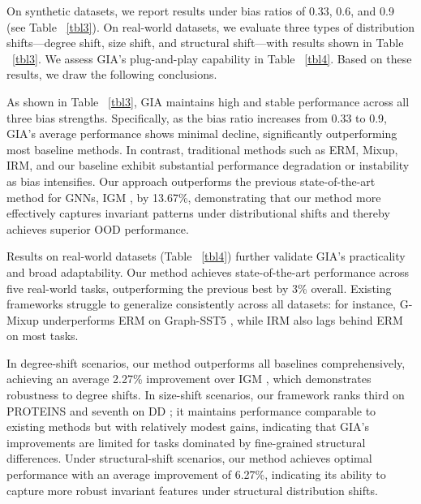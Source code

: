 \documentclass[a4paper,fleqn]{cas-dc}
\begin{document}
On synthetic datasets, we report results under bias ratios of 0.33, 0.6, and 0.9 (see Table ~\ref{tbl3}). On real-world datasets, we evaluate three types of distribution shifts—degree shift, size shift, and structural shift—with results shown in Table ~\ref{tbl3}. We assess GIA's plug-and-play capability in Table ~\ref{tbl4}. Based on these results, we draw the following conclusions.

As shown in Table ~\ref{tbl3}, GIA maintains high and stable performance across all three bias strengths. Specifically, as the bias ratio increases from 0.33 to 0.9, GIA's average performance shows minimal decline, significantly outperforming most baseline methods. In contrast, traditional methods such as ERM, Mixup, IRM, and our baseline exhibit substantial performance degradation or instability as bias intensifies. Our approach outperforms the previous state-of-the-art method for GNNs, IGM \cite{jia2024graph}, by 13.67\%, demonstrating that our method more effectively captures invariant patterns under distributional shifts and thereby achieves superior OOD performance.

Results on real-world datasets (Table ~\ref{tbl4}) further validate GIA's practicality and broad adaptability. Our method achieves state-of-the-art performance across five real-world tasks, outperforming the previous best by 3\% overall. Existing frameworks struggle to generalize consistently across all datasets: for instance, G-Mixup \cite{han2022g} underperforms ERM \cite{donini2018empirical} on Graph-SST5 \cite{socher2013recursive}, while IRM \cite{DBLP:journals/corr/abs-1907-02893} also lags behind ERM \cite{donini2018empirical} on most tasks.

In degree-shift scenarios, our method outperforms all baselines comprehensively, achieving an average 2.27\% improvement over IGM \cite{jia2024graph}, which demonstrates robustness to degree shifts. In size-shift scenarios, our framework ranks third on PROTEINS \cite{Morris+2020} and seventh on DD \cite{Morris+2020}; it maintains performance comparable to existing methods but with relatively modest gains, indicating that GIA's improvements are limited for tasks dominated by fine-grained structural differences. Under structural-shift scenarios, our method achieves optimal performance with an average improvement of 6.27\%, indicating its ability to capture more robust invariant features under structural distribution shifts.
\end{document}
